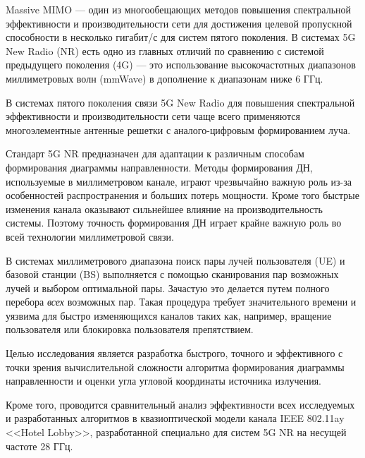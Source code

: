 \documentclass{statphysicsdep}
\begin{document}
\maketitle
\newpage

\small
{
\hypersetup{linkcolor=black}
\tableofcontents
}
\normalsize

% 

\Introduction

Massive MIMO — один из многообещающих методов повышения спектральной
эффективности и производительности сети для достижения целевой пропускной
способности в несколько гигабит/с для систем пятого поколения.  В системах 5G
New Radio (NR) есть одно из главных отличий по сравнению с системой предыдущего
поколения (4G) — это использование высокочастотных диапазонов миллиметровых волн
(mmWave) в дополнение к диапазонам ниже 6 ГГц. 

В системах пятого поколения связи 5G New Radio для повышения спектральной
эффективности и производительности  сети чаще всего применяются многоэлементные 
антенные решетки с аналого-цифровым формированием луча.   

Стандарт 5G NR предназначен для адаптации к различным способам
формирования диаграммы направленности. Методы формирования ДН,
используемые в миллиметровом канале, играют чрезвычайно
важную роль из-за особенностей распространения и больших потерь мощности.
Кроме того быстрые изменения канала оказывают сильнейшее влияние на
производительность системы.  Поэтому точность формирования ДН
играет крайне важную роль во всей технологии миллиметровой связи. 

В системах миллиметрового диапазона поиск пары лучей пользователя (UE)
и базовой станции (BS) выполняется с помощью сканирования пар
возможных лучей и выбором оптимальной пары. Зачастую это делается путем полного
перебора \textit{всех} возможных пар.  Такая процедура требует значительного
времени и уязвима для быстро изменяющихся каналов таких как, например,
вращение пользователя или блокировка пользователя препятствием. 


Целью исследования является разработка  быстрого,
точного и эффективного с точки зрения вычислительной сложности алгоритма
формирования диаграммы направленности и оценки угла угловой координаты источника
излучения.  

Кроме того, проводится сравнительный анализ эффективности всех исследуемых и
разработанных алгоритмов в квазиоптической модели канала IEEE 802.11ay <<Hotel
Lobby>>, разработанной специально для систем 5G NR на несущей частоте 28 ГГц.
\end{document}
